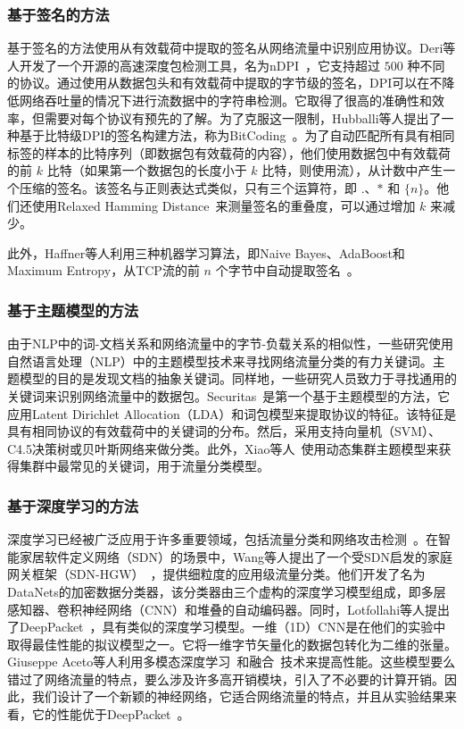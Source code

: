 \documentclass[degree=master,cjk-font=noto]{thuthesis}
\begin{document}
\subsubsection{基于签名的方法}

基于签名的方法使用从有效载荷中提取的签名从网络流量中识别应用协议。Deri等人开发了一个开源的高速深度包检测工具，名为nDPI~\cite{b24}，它支持超过 $500$ 种不同的协议。通过使用从数据包头和有效载荷中提取的字节级的签名，DPI可以在不降低网络吞吐量的情况下进行流数据中的字符串检测。它取得了很高的准确性和效率，但需要对每个协议有预先的了解。为了克服这一限制，Hubballi等人提出了一种基于比特级DPI的签名构建方法，称为BitCoding~\cite{bitcoding}。为了自动匹配所有具有相同标签的样本的比特序列（即数据包有效载荷的内容），他们使用数据包中有效载荷的前 $k$ 比特（如果第一个数据包的长度小于 $k$ 比特，则使用流），从计数中产生一个压缩的签名。该签名与正则表达式类似，只有三个运算符，即 $.$、$*$ 和 $\{n\}$。他们还使用Relaxed Hamming Distance~\cite{bitcoding}来测量签名的重叠度，可以通过增加 $k$ 来减少。

此外，Haffner等人利用三种机器学习算法，即Naive Bayes、AdaBoost和Maximum Entropy，从TCP流的前 $n$ 个字节中自动提取签名~\cite{b19}。

\subsubsection{基于主题模型的方法}

由于NLP中的词-文档关系和网络流量中的字节-负载关系的相似性，一些研究使用自然语言处理（NLP）中的主题模型技术来寻找网络流量分类的有力关键词。主题模型的目的是发现文档的抽象关键词。同样地，一些研究人员致力于寻找通用的关键词来识别网络流量中的数据包。Securitas~\cite{b25}是第一个基于主题模型的方法，它应用Latent Dirichlet Allocation（LDA）和词包模型来提取协议的特征。该特征是具有相同协议的有效载荷中的关键词的分布。然后，采用支持向量机（SVM）、C4.5决策树或贝叶斯网络来做分类。此外，Xiao等人~\cite{DMTCS}使用动态集群主题模型来获得集群中最常见的关键词，用于流量分类模型。

\subsubsection{基于深度学习的方法}

深度学习已经被广泛应用于许多重要领域，包括流量分类和网络攻击检测~\cite{iot_attack_detection}。在智能家居软件定义网络（SDN）的场景中，Wang等人提出了一个受SDN启发的家庭网关框架（SDN-HGW）~\cite{SDN_HGW}，提供细粒度的应用级流量分类。他们开发了名为DataNets的加密数据分类器，该分类器由三个虚构的深度学习模型组成，即多层感知器、卷积神经网络（CNN）和堆叠的自动编码器。同时，Lotfollahi等人提出了DeepPacket~\cite{deep_packet}，具有类似的深度学习模型。一维（1D）CNN是在他们的实验中取得最佳性能的拟议模型之一。它将一维字节矢量化的数据包转化为二维的张量。Giuseppe Aceto等人利用多模态深度学习~\cite{MIMETIC}和融合~\cite{mobile_app_class}技术来提高性能。这些模型要么错过了网络流量的特点，要么涉及许多高开销模块，引入了不必要的计算开销。因此，我们设计了一个新颖的神经网络，它适合网络流量的特点，并且从实验结果来看，它的性能优于DeepPacket~\cite{deep_packet}。
\end{document}
